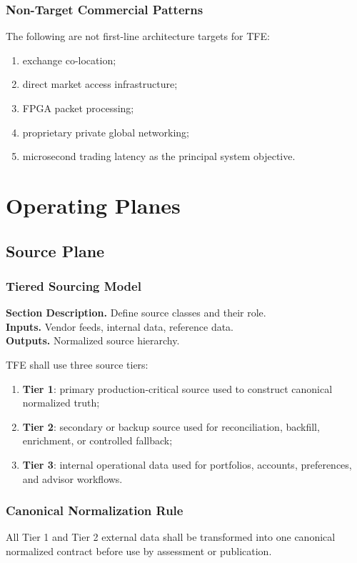 \documentclass[11pt]{report}
\newcommand{\meta}[3]{\textbf{Section Description.} #1\\
\textbf{Inputs.} #2\\
\textbf{Outputs.} #3\par}
\begin{document}
\section{Non-Target Commercial Patterns}
The following are not first-line architecture targets for TFE:
\begin{enumerate}[leftmargin=1.2cm]
    \item exchange co-location;
    \item direct market access infrastructure;
    \item FPGA packet processing;
    \item proprietary private global networking;
    \item microsecond trading latency as the principal system objective.
\end{enumerate}

\part{Operating Planes}

\chapter{Source Plane}
\section{Tiered Sourcing Model}
\meta{Define source classes and their role.}{Vendor feeds, internal data, reference data.}{Normalized source hierarchy.}

TFE shall use three source tiers:
\begin{enumerate}[leftmargin=1.2cm]
    \item \textbf{Tier 1}: primary production-critical source used to construct canonical normalized truth;
    \item \textbf{Tier 2}: secondary or backup source used for reconciliation, backfill, enrichment, or controlled fallback;
    \item \textbf{Tier 3}: internal operational data used for portfolios, accounts, preferences, and advisor workflows.
\end{enumerate}

\section{Canonical Normalization Rule}
All Tier 1 and Tier 2 external data shall be transformed into one canonical normalized contract before use by assessment or publication.
\end{document}
